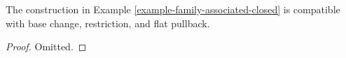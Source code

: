 \begin{lemma}
\label{lemma-family-associated-closed}
The construction in Example \ref{example-family-associated-closed}
is compatible with base change, restriction,
and flat pullback.
\end{lemma}

\begin{proof}
Omitted.
\end{proof}

















